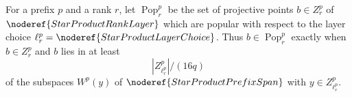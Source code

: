 \begin{definition}
For a prefix \(p\) and a rank \(r\), let
\(\operatorname{Pop}^p_r\) be the set of projective points \(b\in Z^p_r\)
of \(\noderef{StarProductRankLayer}\)
which are popular with respect to the layer choice
\(\ell^p_r=\noderef{StarProductLayerChoice}\).  Thus \(b\in
\operatorname{Pop}^p_r\) exactly when \(b\in Z^p_r\) and \(b\) lies in at
least
\[
  |Z^p_{\ell^p_r}|/(16q)
\]
of the subspaces \(W^p(y)\) of \(\noderef{StarProductPrefixSpan}\) with
\(y\in Z^p_{\ell^p_r}\).
\end{definition}

